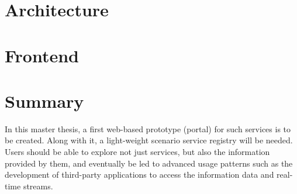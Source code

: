 \section{Architecture}
\section{Frontend}

\section{Summary}
In this master thesis, a first web-based prototype (portal) for such services is to be
created. Along with it, a light-weight scenario service registry will be needed. Users
should be able to explore not just services, but also the information provided by
them, and eventually be led to advanced usage patterns such as the development
of third-party applications to access the information data and real-time streams.